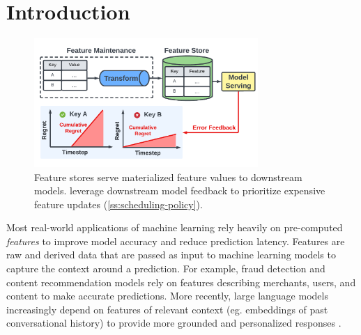 \section{Introduction}
\begin{figure}[t]
\centering
\includegraphics[width=8.5cm]{ralf/figures/overview.pdf}
\caption{Feature stores serve materialized feature values to downstream models. 
\system{} leverage downstream model feedback to prioritize expensive feature updates (\cref{ss:scheduling-policy}).}


\label{f:overview}
\end{figure}

\label{s:introduction}

Most real-world applications of machine learning rely heavily on pre-computed \emph{features} to improve model accuracy and reduce prediction latency.
Features are raw and derived data that are passed as input to machine learning models to capture the context around a prediction.
For example, fraud detection and content recommendation models rely on features describing merchants, users, and content to make accurate predictions. More recently, large language models increasingly depend on features of relevant context (eg. embeddings of past conversational history) to provide more grounded and personalized responses \cite{lee2019latent, guu2020retrieval, packer2023memgpt, lewis2020retrieval}.

